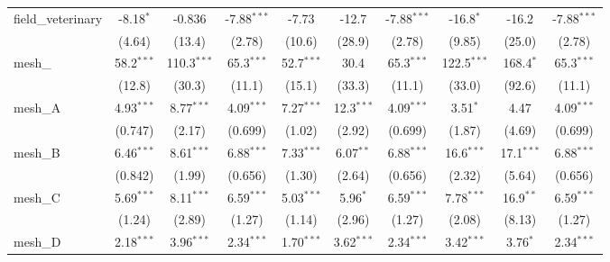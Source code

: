 \begin{tabular}{lccccccccc}
   field\_veterinary                                           & -8.18$^{*}$   & -0.836        & -7.88$^{***}$ & -7.73         & -12.7          & -7.88$^{***}$ & -16.8$^{*}$   & -16.2          & -7.88$^{***}$\\   
                                                               & (4.64)        & (13.4)        & (2.78)        & (10.6)        & (28.9)         & (2.78)        & (9.85)        & (25.0)         & (2.78)\\   
   mesh\_                                                      & 58.2$^{***}$  & 110.3$^{***}$ & 65.3$^{***}$  & 52.7$^{***}$  & 30.4           & 65.3$^{***}$  & 122.5$^{***}$ & 168.4$^{*}$    & 65.3$^{***}$\\   
                                                               & (12.8)        & (30.3)        & (11.1)        & (15.1)        & (33.3)         & (11.1)        & (33.0)        & (92.6)         & (11.1)\\   
   mesh\_A                                                     & 4.93$^{***}$  & 8.77$^{***}$  & 4.09$^{***}$  & 7.27$^{***}$  & 12.3$^{***}$   & 4.09$^{***}$  & 3.51$^{*}$    & 4.47           & 4.09$^{***}$\\   
                                                               & (0.747)       & (2.17)        & (0.699)       & (1.02)        & (2.92)         & (0.699)       & (1.87)        & (4.69)         & (0.699)\\   
   mesh\_B                                                     & 6.46$^{***}$  & 8.61$^{***}$  & 6.88$^{***}$  & 7.33$^{***}$  & 6.07$^{**}$    & 6.88$^{***}$  & 16.6$^{***}$  & 17.1$^{***}$   & 6.88$^{***}$\\   
                                                               & (0.842)       & (1.99)        & (0.656)       & (1.30)        & (2.64)         & (0.656)       & (2.32)        & (5.64)         & (0.656)\\   
   mesh\_C                                                     & 5.69$^{***}$  & 8.11$^{***}$  & 6.59$^{***}$  & 5.03$^{***}$  & 5.96$^{*}$     & 6.59$^{***}$  & 7.78$^{***}$  & 16.9$^{**}$    & 6.59$^{***}$\\   
                                                               & (1.24)        & (2.89)        & (1.27)        & (1.14)        & (2.96)         & (1.27)        & (2.08)        & (8.13)         & (1.27)\\   
   mesh\_D                                                     & 2.18$^{***}$  & 3.96$^{***}$  & 2.34$^{***}$  & 1.70$^{***}$  & 3.62$^{***}$   & 2.34$^{***}$  & 3.42$^{***}$  & 3.76$^{*}$     & 2.34$^{***}$\\   

\end{tabular}
